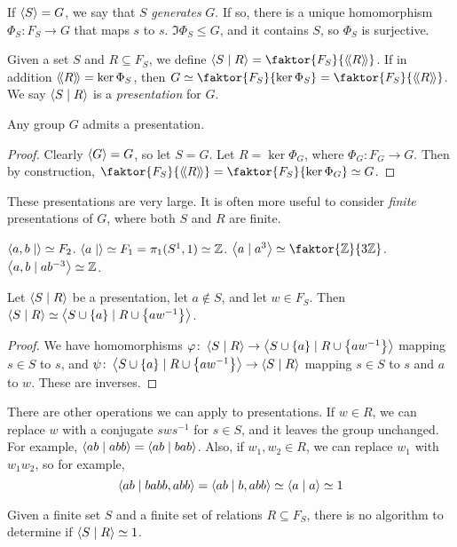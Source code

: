 If \( \left\langle{} S \right\rangle = G \), we say that \( S \) \emph{generates} \( G \).
If so, there is a unique homomorphism \( \Phi_S \colon F_S \to G \) that maps \( s \) to \( s \).
\( \Im \Phi_S \leq G \), and it contains \( S \), so \( \Phi_S \) is surjective.
\begin{definition}
	Given a set \( S \) and \( R \subseteq F_S \), we define \( \genset{S\mid R} = \faktor{F_S}{\ngenset R} \).
	If in addition \( \left\langle\!\left\langle{} R \right\rangle\!\right\rangle = \ker \Phi_S \), then \( G \simeq \faktor{F_S}{\ker \Phi_S} = \faktor{F_S}{\ngenset R} \).
	We say \( \left\langle{} S\mid R \right\rangle \) is a \emph{presentation} for \( G \).
\end{definition}
\begin{proposition}
	Any group \( G \) admits a presentation.
\end{proposition}
\begin{proof}
	Clearly \( \left\langle{} G \right\rangle = G \), so let \( S = G \).
	Let \( R = \ker \Phi_G \), where \( \Phi_G \colon F_G \to G \).
	Then by construction, \( \faktor{F_S}{\ngenset R} = \faktor{F_S}{\ker \Phi_G} \simeq G \).
\end{proof}
\begin{remark}
	These presentations are very large.
	It is often more useful to consider \emph{finite} presentations of \( G \), where both \( S \) and \( R \) are finite.
\end{remark}
\begin{example}
	\( \left\langle{} a,b \mid \right\rangle \simeq F_2 \).
	\( \left\langle{} a \mid \right\rangle \simeq F_1 = \pi_1(S^1,1) \simeq \mathbb Z \).
	\( \genset{a \mid a^3} \simeq \faktor{\mathbb Z}{3\mathbb Z} \).
	\( \left\langle{} a, b \mid ab^{-3} \right\rangle \simeq \mathbb Z \).
\end{example}
\begin{proposition}
	Let \( \left\langle{} S\mid R \right\rangle \) be a presentation, let $a \not\in S$, and let \( w \in F_S \).
	Then \( \left\langle{} S \mid R \right\rangle \simeq \left\langle{} S \cup \qty{a} \mid R \cup \qty{aw^{-1}} \right\rangle \).
\end{proposition}
\begin{proof}
	We have homomorphisms \( \varphi \colon \left\langle{} S \mid R \right\rangle \to \left\langle{} S \cup \qty{a} \mid R \cup \qty{aw^{-1}} \right\rangle \) mapping \( s \in S \) to \( s \), and \( \psi \colon \left\langle{} S \cup \qty{a} \mid R \cup \qty{aw^{-1}} \right\rangle \to \left\langle{} S \mid R \right\rangle \) mapping \( s \in S \) to \( s \) and \( a \) to \( w \).
	These are inverses.
\end{proof}
There are other operations we can apply to presentations.
If \( w \in R \), we can replace \( w \) with a conjugate \( sws^{-1} \) for \( s \in S \), and it leaves the group unchanged.
For example, \( \left\langle{} ab \mid abb \right\rangle = \left\langle{} ab \mid bab \right\rangle \).
Also, if \( w_1, w_2 \in R \), we can replace \( w_1 \) with \( w_1w_2 \), so for example,
\[ \left\langle{} ab \mid babb, abb \right\rangle = \left\langle{} ab \mid b, abb \right\rangle \simeq \left\langle{} a \mid a \right\rangle \simeq 1 \]
\begin{theorem}
	Given a finite set \( S \) and a finite set of relations \( R \subseteq F_S \), there is no algorithm to determine if \( \left\langle{} S \mid R \right\rangle \simeq 1 \).
\end{theorem}

